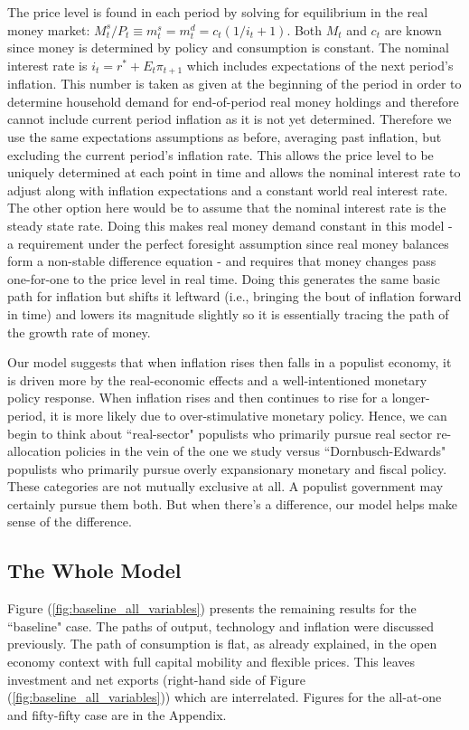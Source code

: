 \documentclass{OUP-EJ}
\begin{document}
The price level is found in each period by solving for equilibrium in the real money market: $M_t^s / P_t \equiv m^s_t=m^d_t=c_t(1/i_t +1)$.  Both $M_t$ and $c_t$ are known since money is determined by policy and consumption is constant.  The nominal interest rate is $i_t = r^* + E_t \pi_{t+1}$ which includes expectations of the next period's inflation.  This number is taken as given at the beginning of the period in order to determine household demand for end-of-period real money holdings and therefore cannot include current period inflation as it is not yet determined. Therefore we use the same expectations assumptions as before, averaging past inflation, but excluding the current period's inflation rate. This allows the price level to be uniquely determined at each point in time and allows the nominal interest rate to adjust along with inflation expectations and a constant world real interest rate. The other option here would be to assume that the nominal interest rate is the steady state rate. Doing this makes real money demand constant in this model - a requirement under the perfect foresight assumption since real money balances form a non-stable difference equation - and requires that money changes pass one-for-one to the price level in real time. Doing this generates the same basic path for inflation but shifts it leftward (i.e., bringing the bout of inflation forward in time) and lowers its magnitude slightly so it is essentially tracing the path of the growth rate of money.

Our model suggests that when inflation rises then falls in a populist economy, it is driven more by the real-economic effects and a well-intentioned monetary policy response.  When inflation rises and then continues to rise for a longer-period, it is more likely due to over-stimulative monetary policy.  Hence, we can begin to think about ``real-sector" populists who primarily pursue real sector re-allocation policies in the vein of the one we study versus ``Dornbusch-Edwards" populists who primarily pursue overly expansionary monetary and fiscal policy.  These categories are not mutually exclusive at all. A populist government may certainly pursue them both.  But when there's a difference, our model helps make sense of the difference.

\subsection{The Whole Model}

Figure (\ref{fig:baseline_all_variables}) presents the remaining results for the ``baseline" case. The paths of output, technology and inflation were discussed previously.  The path of consumption is flat, as already explained, in the open economy context with full capital mobility and flexible prices.  This leaves investment and net exports (right-hand side of Figure (\ref{fig:baseline_all_variables})) which are interrelated.  Figures for the all-at-one and fifty-fifty case are in the Appendix.
\end{document}
